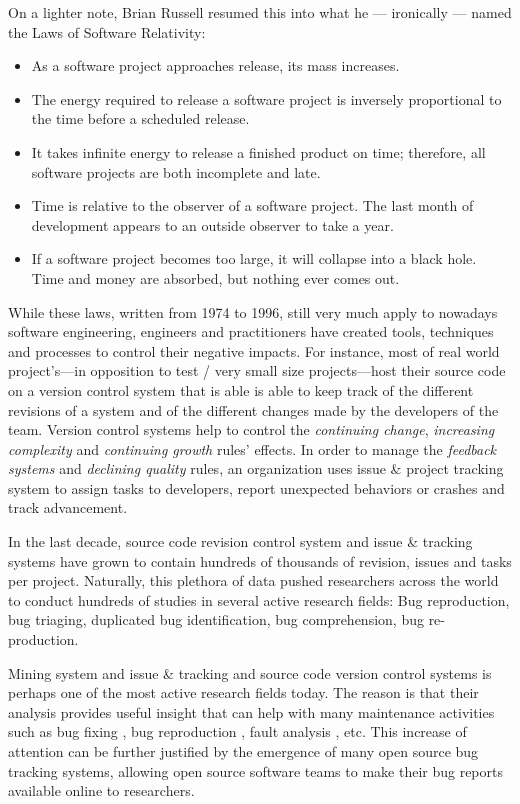 On a lighter note, Brian Russell resumed this into what he --- ironically --- named the Laws of Software Relativity:

\begin{itemize}
\item As a software project approaches release, its mass increases.
\item The energy required to release a software project is inversely proportional to the time before a scheduled release.
\item It takes infinite energy to release a finished product on time; therefore, all software projects are both incomplete and late.
\item Time is relative to the observer of a software project. The last month of development appears to an outside observer to take a year.
\item If a software project becomes too large, it will collapse into a black hole. Time and money are absorbed, but nothing ever comes out.
\end{itemize}

While these laws, written from 1974 to 1996, still very much apply to nowadays software engineering, engineers and practitioners have created tools, techniques and processes to control their negative impacts.
For instance, most of real world project's---in opposition to test / very small size projects---host their source code on a version control system \cite{rochkind1975source} that is able is able to keep track of the different revisions of a system and of the different changes made by the developers of the team.
Version control systems help to control the {\it continuing change}, {\it increasing complexity} and {\it continuing growth} rules' effects.
In order to manage the {\it feedback systems} and {\it declining quality} rules, an organization uses issue \& project tracking system to assign tasks to developers, report unexpected behaviors or crashes and track advancement.

In the last decade, source code revision control system and issue \& tracking systems have grown to contain hundreds of thousands of revision, issues and tasks per project.
Naturally, this plethora of data pushed researchers across the world to conduct hundreds of studies in several active research fields: Bug reproduction, bug triaging, duplicated bug identification, bug comprehension, bug re-production.

Mining system and issue \& tracking and source code version control systems is perhaps one of the most active research fields today. The reason is that their analysis provides useful insight that can help with many maintenance activities such as bug fixing \cite{Weiss2007,Saha2014}, bug reproduction \cite{Artzi2008,Jin2012,Chen2013}, fault analysis \cite{Jiang2012,Jin2013}, etc. This increase of attention can be further justified by the emergence of many open source bug tracking systems, allowing open source software teams to make their bug reports available online to researchers.

